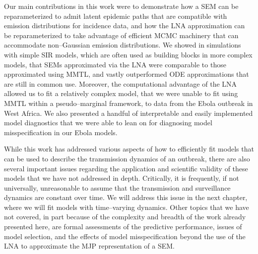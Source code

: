 Our main contributions in this work were to demonstrate how a SEM can be reparameterized to admit latent epidemic paths that are compatible with emission distributions for incidence data, and how the LNA approximation can be reparameterized to take advantage of efficient MCMC machinery that can accommodate non--Gaussian emission distributions. We showed in simulations with simple SIR models, which are often used as building blocks in more complex models, that SEMs approximated via the LNA were comparable to those approximated using MMTL, and vastly outperformed ODE approximations that are still in common use. Moreover, the computational advantage of the LNA allowed us to fit a relatively complex model, that we were unable to fit using MMTL within a pseudo--marginal framework, to data from the Ebola outbreak in West Africa. We also presented a handful of interpretable and easily implemented model diagnostics that we were able to lean on for diagnosing model misspecification in our Ebola models.

While this work has addressed various aspects of how to efficiently fit models that can be used to describe the transmission dynamics of an outbreak, there are also several important issues regarding the application and scientific validity of these models that we have not addressed in depth. Critically, it is frequently, if not universally, unreasonable to assume that the transmission and surveillance dynamics are constant over time. We will address this issue in the next chapter, where we will fit models with time--varying dynamics. Other topics that we have not covered, in part because of the complexity and breadth of the work already presented here, are formal assessments of the predictive performance, issues of model selection, and the effects of model misspecification beyond the use of the LNA to approximate the MJP representation of a SEM.